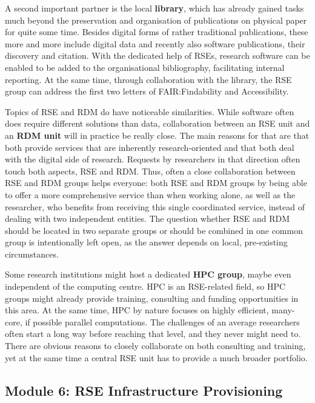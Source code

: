 \documentclass[a4paper]{article}
\begin{document}
A second important partner is the local \textbf{library}, which has already gained tasks much beyond the preservation and organisation of publications on physical paper for quite some time.
Besides digital forms of rather traditional publications, these more and more include digital data and recently also software publications, their discovery and citation.
With the dedicated help of RSEs, research software can be enabled to be added to the organisational bibliography, facilitating internal reporting.
At the same time, through collaboration with the library, the RSE group can address the first two letters of FAIR:\@ Findability and Accessibility.

Topics of RSE and RDM do have noticeable similarities.
While software often does require different solutions than data, collaboration between an RSE unit and an \textbf{RDM unit} will in practice be really close.
The main reasons for that are that both provide services that are inherently research-oriented and that both deal with the digital side of research.
Requests by researchers in that direction often touch both aspects, RSE and RDM\@.
Thus, often a close collaboration between RSE and RDM groups helps everyone: both RSE and RDM groups by being able to offer a more comprehensive service than when working alone, as well as the researcher, who benefits from receiving this single coordinated service, instead of dealing with two independent entities.
The question whether RSE and RDM should be located in two separate groups or should be combined in one common group is intentionally left open, as the answer depends on local, pre-existing circumstances.

Some research institutions might host a dedicated \textbf{HPC group}, maybe even independent of the computing centre.
HPC is an RSE-related field, so HPC groups might already provide training, consulting and funding opportunities in this area.
At the same time, HPC by nature focuses on highly efficient, many-core, if possible parallel computations.
The challenges of an average researchers often start a long way before reaching that level, and they never might need to.
There are obvious reasons to closely collaborate on both consulting and training, yet at the same time a central RSE unit has to provide a much broader portfolio.

\subsection{Module 6: RSE Infrastructure Provisioning}%
\label{sec:infrastructure}
\end{document}
